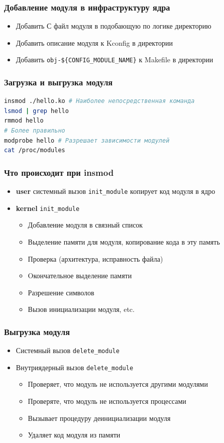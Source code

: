 \begin{frame}
  \frametitle{Добавление модуля в инфраструктуру ядра}
  \begin{itemize}
    \item Добавить С файл модуля в подобающую по логике директорию
    \item Добавить описание модуля к Kconfig в директории
    \item Добавить \texttt{obj-\$\{CONFIG\_MODULE\_NAME\}} к Makefile в директории 
  \end{itemize}
\end{frame}

\begin{frame}[fragile]
  \frametitle{Загрузка и выгрузка модуля}
\begin{lstlisting}[language=bash]
insmod ./hello.ko # Наиболее непосредственная команда
lsmod | grep hello
rmmod hello
# Более правильно
modprobe hello # Разрешает зависимости модулей
cat /proc/modules
\end{lstlisting}

\end{frame}

\begin{frame}
  \frametitle{Что происходит при insmod}
  \begin{itemize}
    \item \textbf{user} 
      системный вызов \texttt{init\_module} копирует код модуля в ядро
    \item \textbf{kernel}
      \texttt{init\_module}
      \begin{itemize}
        \item Добавление модуля в связный список
        \item Выделение памяти для модуля, копирование кода в эту память
        \item Проверка (архитектура, исправность файла)
        \item Oкончательное выделение памяти
        \item Разрешение символов
        \item Вызов инициализации модуля, etc.
      \end{itemize}
  \end{itemize}
\end{frame}

\begin{frame}
  \frametitle{Выгрузка модуля}
  \begin{itemize}
    \item Системный вызов \texttt{delete\_module}
    \item Внутриядерный вызов \texttt{delete\_module}
      \begin{itemize}
        \item Проверяет, что модуль не используется другими модулями
        \item Проверяте, что модуль не используется процессами
        \item Вызывает процедуру деинициализации модуля
        \item Удаляет код модуля из памяти
      \end{itemize}
  \end{itemize}
\end{frame}

